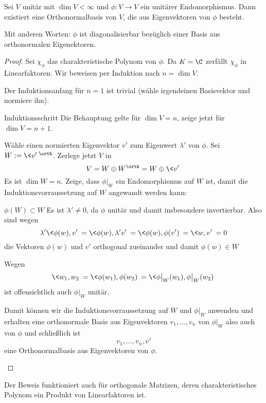 \documentclass[a4paper, 10pt]{scrbook}
\begin{document}
\begin{thm}
	\label{thm:13.20}
	Sei $V$ unitär mit $\dim V<\infty$ und $\phi:V\to V$ ein unitärer Endomorphismus.
	Dann existiert eine Orthonormalbasis von $V$, die aus Eigenvektoren von $\phi$ besteht.
	\begin{note}
		Mit anderen Worten: $\phi$ ist diagonalisierbar bezüglich einer Basis aus orthonormalen Eigenektoren.
	\end{note}
	\begin{proof}
		Sei $\chi_\phi$ das charakteristische Polynom von $\phi$.
		Da $K=\C$ zerfällt $\chi_\phi$ in Linearfaktoren.
		Wir beweisen per Induktion nach $n = \dim V$.

		Der Induktionsanfang für $n=1$ ist trivial (wähle irgendeinen Basisvektor und normiere ihn).
		
		\begin{seg}{Induktionsschritt}
			Die Behauptung gelte für $\dim V=n$, zeige jetzt für $\dim V=n+1$.

			Wähle einen normierten Eigenvektor $v'$ zum Eigenwert $\lambda'$ von $\phi$.
			Sei $W := \<v'\>^\orth$.
			Zerlege jetzt $V$ in
			\[
				V = W \oplus W^\orth = W \oplus \<v'\>
			\]
			Es ist $\dim W = n$.
			Zeige, dass $\phi\big|_W$ ein Endomorphismus auf $W$ ist, damit die Induktionsvorraussetzung auf $W$ angewandt werden kann:

			\begin{seg}{$\phi(W) \subset W$}
				Es ist $\lambda'\neq 0$, da $\phi$ unitär und damit insbesondere invertierbar.
				Also sind wegen
				\[
					\lambda' \<\phi(w),v'\> = \<\phi(w),\lambda'v'\> = \<\phi(w),\phi(v')\> = \<w,v'\> = 0
				\]
				die Vektoren $\phi(w)$ und $v'$ orthogonal zueinander und damit $\phi(w)\in W$				
			\end{seg}
			Wegen
			\[
				\<w_1,w_2\> = \<\phi(w_1),\phi(w_2)\> = \<\phi\big|_W(w_1),\phi\big|_W(w_2)\>
			\]
			ist offensichtlich auch $\phi|_W$ unitär.

			Damit können wir die Induktionsvorraussetzung auf $W$ und $\phi|_W$ anwenden und erhalten eine orthonormale Basis aus Eigenvektoren $v_1,\dotsc,v_n$ von $\phi|_W$ also auch von $\phi$ und schließlich ist
			\[
				v_1,\dotsc, v_n, v'
			\]
			eine Orthonormalbasis aus Eigenvektoren von $\phi$.
		\end{seg}
	\end{proof}
	\begin{note}
		Der Beweis funktioniert auch für orthogonale Matrizen, deren charakteristisches Polynom ein Produkt von Linearfaktoren ist.
	\end{note}
\end{thm}
\end{document}
